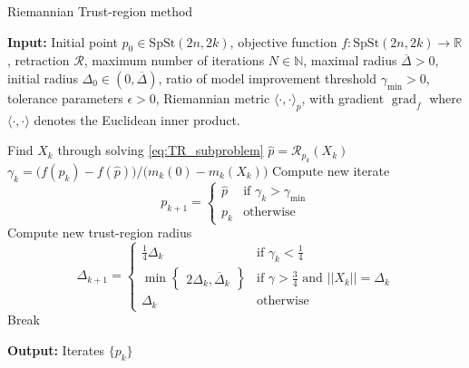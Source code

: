 \begin{algorithm}[H]
    \caption{Riemannian Trust-region method}\label{alg:Trust_region}
    \textbf{Input:} Initial point $p_{0}\in \mathrm{SpSt}(2n, 2k)$, objective function $f\colon\mathrm{SpSt}(2n, 2k)\to \mathbb{R}$, retraction $\mathcal{R}$, maximum number of iterations $N\in \mathbb{N}$,  maximal radius $\overline{\Delta}>0$, initial radius $\Delta_{0}\in(0,\overline{\Delta})$, ratio of model improvement threshold $\gamma_{\text{min}}>0$, tolerance parameters $\epsilon>0$, Riemannian metric $\langle \cdot,\cdot \rangle_{p}$, with gradient $\operatorname*{grad}_{f}$ where $\langle \cdot,\cdot \rangle$ denotes the Euclidean inner product.
    \begin{algorithmic}[1]
        \State Find $X_{k}$ through solving \eqref{eq:TR_subproblem}
        \State $\hat{p}=\mathcal{R}_{p_{k}}(X_{k})$
        \State $\gamma_{k}=\big(f(p_{k})-f(\hat{p})\big)/\big(m_{k}(0)-m_{k}(X_{k})\big)$
        \State Compute new iterate\begin{equation*}
            p_{k+1}=
            \begin{cases}
            \hat{p} & \text{if }\gamma_{k}>\gamma_{\text{min}} \\
            p_{k}  & \text{otherwise}
            \end{cases}
            \end{equation*}
        \State Compute new trust-region radius\begin{equation*}
    \Delta_{k+1}=
    \begin{cases}
    \frac{1}{4}\Delta_{k} & \text{if }\gamma_{k}<\frac{1}{4} \\
    \operatorname{min}\begin{Bmatrix}2\Delta_{k},\overline{\Delta}_{k}\end{Bmatrix} & \text{if }\gamma>\frac{3}{4}\text{ and }\lvert \lvert X_{k} \rvert  \rvert =\Delta_{k} \\
    \Delta_{k} & \text{otherwise}
    \end{cases}
    \end{equation*}  
        \State Break
        \EndIf
    \EndFor
    \end{algorithmic}
    \textbf{Output:} Iterates $\{p_{k}\}$
\end{algorithm}

